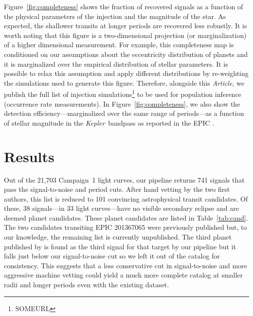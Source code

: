 \documentclass[12pt,preprint]{aastex}
\newcommand{\project}[1]{\textsl{#1}} %
\newcommand{\kepler}{\project{Kepler}}
\newcommand{\paper}{\textsl{Article}}
\newcommand{\figref}[1]{\ref{fig:#1}}
\newcommand{\Fig}[1]{Figure~\figref{#1}}
\newcommand{\fig}[1]{\Fig{#1}}
\newcommand{\Tab}[1]{Table~\ref{tab:#1}}
\newcommand{\tab}[1]{\Tab{#1}}
\newcommand{\sectlabel}[1]{\label{sect:#1}}
\newcommand{\todo}[3]{{\color{#2}\emph{#1}: #3}}
\newcommand{\dfmtodo}[1]{\todo{DFM}{red}{#1}}
\begin{document}
\Fig{completeness} shows the fraction of recovered signals as a function of
the physical parameters of the injection and the magnitude of the star.
As expected, the shallower transits at longer periods are recovered less
robustly.
It is worth noting that this figure is a two-dimensional projection (or
marginalization) of a higher dimensional measurement.
For example, this completeness map is conditioned on our assumptions about
the eccentricity distribution of planets and it is marginalized over the
empirical distribution of stellar parameters.
It is possible to relax this assumption and apply different distributions by
re-weighting the simulations used to generate this figure.
Therefore, alongside this \paper, we publish the full list of injection
simulations\footnote{SOMEURL} to be used for population inference (occurrence
rate measurements).
In \fig{completeness}, we also show the detection efficiency---marginalized
over the same range of periods---as a function of stellar magnitude in the
\kepler\ bandpass as reported in the EPIC \citep{epic}.


\section{Results}
\sectlabel{results}

Out of the 21,703 Campaign~1 light curves, our pipeline returns 741 signals
that pass the signal-to-noise and period cuts.
After hand vetting by the two first authors, this list is reduced to 101
convincing astrophysical transit candidates.
Of these, 38 signals---in 33 light curves---have no visible secondary
eclipse and are deemed planet candidates.
These planet candidates are listed in \tab{cand}.
The two candidates transiting EPIC 201367065 were previously published
\citep{Crossfield:2015} but, to our knowledge, the remaining list is currently
unpublished.
The third planet published by \citet{Crossfield:2015} is found as the third
signal for that target by our pipeline but it falls just below our
signal-to-noise cut so we left it out of the catalog for consistency.
This suggests that a less conservative cut in signal-to-noise and more
aggressive machine vetting could yield a much more complete catalog at smaller
radii and longer periods even with the existing dataset.

\end{document}
